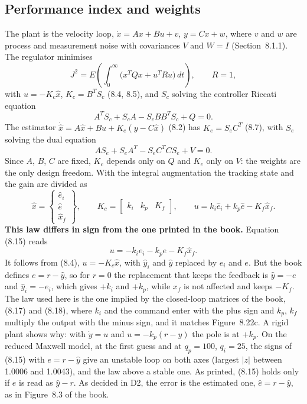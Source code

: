 \documentclass[10pt,a4paper]{article}
\numberwithin{equation}{section}
\begin{document}
\subsection{Performance index and weights}
The plant is the velocity loop, $\dot x=Ax+Bu+v$, $y=Cx+w$, where $v$ and $w$ are process and measurement noise with covariances $V$ and $W=I$ (Section~8.1.1). The regulator minimises
\begin{equation}
J^2=E\!\left(\int_0^\infty\bigl(x^TQx+u^TRu\bigr)\,dt\right),\qquad R=1,\tag{8.3}
\end{equation}
with $u=-K_c\hat x$, $K_c=B^TS_c$ (8.4, 8.5), and $S_c$ solving the controller Riccati equation
\begin{equation}
A^TS_c+S_cA-S_cBB^TS_c+Q=0.\tag{8.6}
\end{equation}
The estimator $\dot{\hat x}=A\hat x+Bu+K_e(y-C\hat x)$ (8.2) has $K_e=S_eC^T$ (8.7), with $S_e$ solving the dual equation
\begin{equation}
AS_e+S_eA^T-S_eC^TCS_e+V=0.\tag{8.8}
\end{equation}
Since $A$, $B$, $C$ are fixed, $K_c$ depends only on $Q$ and $K_e$ only on $V$: the weights are the only design freedom. With the integral augmentation the tracking state and the gain are divided as
\begin{equation}
\hat x=\begin{Bmatrix}\hat e_i\\\hat e\\\hat x_f\end{Bmatrix},\qquad K_c=\begin{bmatrix}k_i&k_p&K_f\end{bmatrix},\qquad u=k_i\hat e_i+k_p\hat e-K_f\hat x_f.\tag{8.12, 8.14}
\end{equation}
\textbf{This law differs in sign from the one printed in the book.} Equation (8.15) reads
\begin{equation}
u=-k_ie_i-k_pe-K_f\hat x_f.\tag{8.15}
\end{equation}
It follows from (8.4), $u=-K_c\hat x$, with $\hat y_i$ and $\hat y$ replaced by $e_i$ and $e$. But the book defines $e=r-\hat y$, so for $r=0$ the replacement that keeps the feedback is $\hat y=-e$ and $\hat y_i=-e_i$, which gives $+k_i$ and $+k_p$, while $x_f$ is not affected and keeps $-K_f$. The law used here is the one implied by the closed-loop matrices of the book, (8.17) and (8.18), where $k_i$ and the command enter with the plus sign and $k_p$, $k_f$ multiply the output with the minus sign, and it matches Figure~8.22c. A rigid plant shows why: with $\dot y=u$ and $u=-k_p(r-y)$ the pole is at $+k_p$. On the reduced Maxwell model, at the first guess and at $q_p=100$, $q_i=25$, the signs of (8.15) with $e=r-\hat y$ give an unstable loop on both axes (largest $|z|$ between 1.0006 and 1.0043), and the law above a stable one. As printed, (8.15) holds only if $e$ is read as $\hat y-r$. As decided in D2, the error is the estimated one, $\hat e=r-\hat y$, as in Figure~8.3 of the book.
\end{document}
